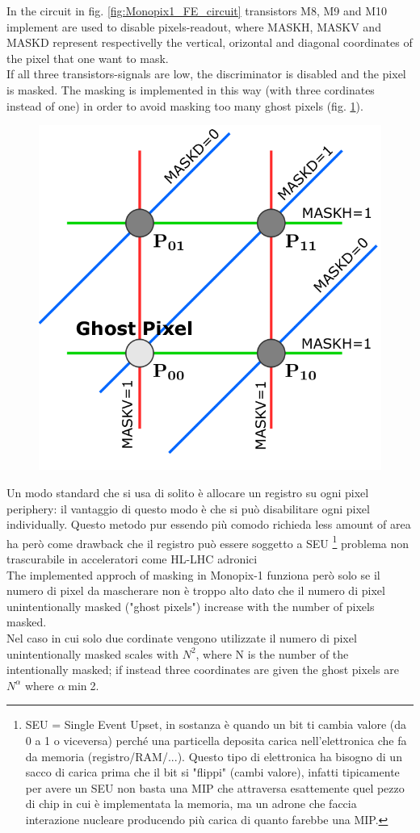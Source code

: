     In the circuit in fig. \ref{fig:Monopix1_FE_circuit} transistors M8, M9 and M10 implement are used to disable pixels-readout, where MASKH, MASKV and MASKD represent respectivelly the vertical, orizontal and diagonal coordinates of the pixel that one want to mask. \\ 
    If all three transistors-signals are low, the discriminator is disabled and the pixel is masked. The masking is implemented in this way (with three cordinates instead of one) in order to avoid masking too many ghost pixels (fig. \ref{fig:masking_scheme}).
    \begin{figure}[h!]
        \centering
        \includegraphics[width=.3\linewidth]{figures/Monopix1/masking_scheme.png}
        \caption{}
        \label{fig:masking_scheme}
    \end{figure}
    Un modo standard che si usa di solito è allocare un registro su ogni pixel periphery: il vantaggio di questo modo è che si può disabilitare ogni pixel individually. Questo metodo pur essendo più comodo richieda less amount of area ha però come drawback che il registro può essere soggetto a SEU \footnote{SEU = Single Event Upset, in sostanza è quando un bit ti cambia valore (da 0 a 1 o viceversa) perché una particella deposita carica nell'elettronica che fa da memoria (registro/RAM/...). Questo tipo di elettronica ha bisogno di un sacco di carica prima che il bit si "flippi" (cambi valore), infatti tipicamente per avere un SEU non basta una MIP che attraversa esattemente quel pezzo di chip in cui è implementata la memoria, ma un adrone che faccia interazione nucleare producendo più carica di quanto farebbe una MIP.} problema non trascurabile in acceleratori come HL-LHC adronici\\
    The implemented approch of masking in Monopix-1 funziona però solo se il numero di pixel da mascherare non è troppo alto dato che il numero di pixel unintentionally masked ("ghost pixels") increase with the number of pixels masked. \\
    Nel caso in cui solo due cordinate vengono utilizzate il numero di pixel unintentionally masked scales with $N^2$, where N is the number of the intentionally masked; if instead three coordinates are given the ghost pixels are $N^\alpha$ where $\alpha \min$2.\\


